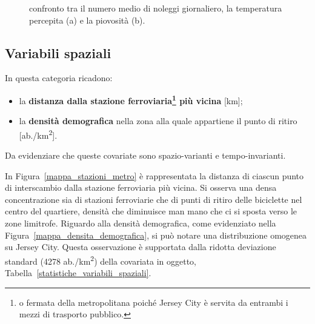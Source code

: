 \begin{figure}[htpb]
	\centering
	\quad
	\quad
	\caption[Confronto tra il numero medio di noleggi giornaliero, la temperatura percepita e la piovosità]{confronto tra il numero medio di noleggi giornaliero, la temperatura percepita (a) e la piovosità (b).}
	\label{ritiri_vs_variabili_meteo}
\end{figure}

\subsection[Variabili spaziali]{Variabili spaziali}
In questa categoria ricadono:
\begin{itemize}
	\item la \textbf{distanza dalla stazione ferroviaria\footnote{o fermata della metropolitana poiché Jersey City è servita da entrambi i mezzi di trasporto pubblico.} più vicina} [\unit{\kilo\meter}];
	\item la \textbf{densità demografica} nella zona alla quale appartiene il punto di ritiro [ab./\unit{\kilo\meter\squared}].
\end{itemize}
Da evidenziare che queste covariate sono spazio-varianti e tempo-invarianti.
\par In Figura~\ref{mappa_stazioni_metro} è rappresentata la distanza di ciascun punto di interscambio dalla stazione ferroviaria più vicina. Si osserva una densa concentrazione sia di stazioni ferroviarie che di punti di ritiro delle biciclette nel centro del quartiere, densità che diminuisce man mano che ci si sposta verso le zone limitrofe. Riguardo alla densità demografica, come evidenziato nella Figura~\ref{mappa_densita_demografica}, si può notare una distribuzione omogenea su Jersey City. Questa osservazione è supportata dalla ridotta deviazione standard (\num{4278} ab./\unit{\kilo\meter\squared}) della covariata in oggetto, Tabella~\ref{statistiche_variabili_spaziali}.

